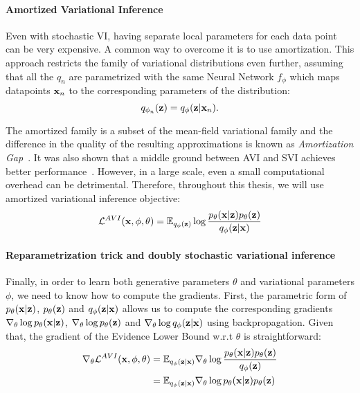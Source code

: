 \paragraph{Amortized Variational Inference}
Even with stochastic VI, having separate local parameters for each data point can be very expensive. 
A common way to overcome it is to use amortization. This approach restricts the family of variational distributions even further, assuming that all the $q_n$ are parametrized with the same Neural Network $f_{\phi}$ which maps datapoints ${\mathbf{x}}_n$ to the corresponding parameters of the distribution: 
\begin{equation}
    q_{\phi_n}({\mathbf{z}}) = q_{\phi}({\mathbf{z}} |{\mathbf{x}}_n).
\end{equation}

The amortized family is a subset of the mean-field variational family and the difference in the quality of the resulting approximations is known as \textit{Amortization Gap}~\citep{cremer2018inference}. It was also shown that a middle ground between AVI and SVI achieves better performance~\citep{kim2018semi}. However, in a large scale, even a small computational overhead can be detrimental. Therefore, throughout this thesis, we will use amortized variational inference objective:
\begin{equation}\label{eq:intro_avi}
     \mathcal{L}^{AVI}(\rvx, \phi, \theta) =  \E_{q_{\phi}(\rvz)}\log  \frac{p_{\theta}(\rvx|\rvz)p_{\theta}(\rvz)}{q_{\phi}(\rvz|\rvx)}
\end{equation}

\paragraph{Reparametrization trick and doubly stochastic variational inference}
Finally, in order to learn both generative parameters $\theta$ and variational parameters $\phi$, we need to know how to compute the gradients. First, the parametric form of $p_{\theta}({\mathbf{x}}|{\mathbf{z}})$, $p_{\theta}({\mathbf{z}})$ and $q_{\phi}({\mathbf{z}}|{\mathbf{x}})$ allows us to compute the corresponding gradients $\nabla_{\theta}\log p_{\theta}({\mathbf{x}}|{\mathbf{z}})$, $\nabla_{\theta}\log p_{\theta}({\mathbf{z}})$ and $\nabla_{\theta}\log q_{\phi}({\mathbf{z}}|{\mathbf{x}})$ using backpropagation. Given that, the gradient of the Evidence Lower Bound w.r.t $\theta$ is straightforward:
\begin{equation}
    \begin{aligned}
      \nabla_{\theta}\mathcal{L}^{AVI}({\mathbf{x}}, \phi, \theta) 
      &= \mathbb{E}_{q_{\phi}({\mathbf{z}}|{\mathbf{x}})} \nabla_{\theta} \log  \frac{p_{\theta}({\mathbf{x}}|{\mathbf{z}})p_{\theta}({\mathbf{z}})}{q_{\phi}({\mathbf{z}})} \\
      &= \mathbb{E}_{q_{\phi}({\mathbf{z}}|{\mathbf{x}})} \nabla_{\theta} \log p_{\theta}({\mathbf{x}}|{\mathbf{z}})p_{\theta}({\mathbf{z}})
    \end{aligned}
\end{equation}

